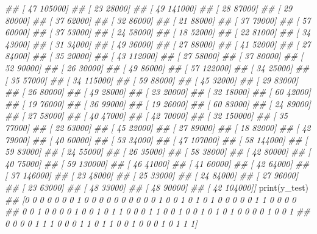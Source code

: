 \documentclass[
]{book}
\newenvironment{Shaded}{\begin{snugshade}}{\end{snugshade}}
\newcommand{\BuiltInTok}[1]{#1}
\newcommand{\CommentTok}[1]{\textcolor[rgb]{0.56,0.35,0.01}{\textit{#1}}}
\newcommand{\NormalTok}[1]{#1}
\theoremstyle{definition}
\theoremstyle{definition}
\theoremstyle{definition}
\theoremstyle{definition}
\theoremstyle{remark}
\begin{document}
\begin{Shaded}
\begin{Highlighting}[]
\CommentTok{\#\#  [    47 105000]}
\CommentTok{\#\#  [    23  28000]}
\CommentTok{\#\#  [    49 141000]}
\CommentTok{\#\#  [    28  87000]}
\CommentTok{\#\#  [    29  80000]}
\CommentTok{\#\#  [    37  62000]}
\CommentTok{\#\#  [    32  86000]}
\CommentTok{\#\#  [    21  88000]}
\CommentTok{\#\#  [    37  79000]}
\CommentTok{\#\#  [    57  60000]}
\CommentTok{\#\#  [    37  53000]}
\CommentTok{\#\#  [    24  58000]}
\CommentTok{\#\#  [    18  52000]}
\CommentTok{\#\#  [    22  81000]}
\CommentTok{\#\#  [    34  43000]}
\CommentTok{\#\#  [    31  34000]}
\CommentTok{\#\#  [    49  36000]}
\CommentTok{\#\#  [    27  88000]}
\CommentTok{\#\#  [    41  52000]}
\CommentTok{\#\#  [    27  84000]}
\CommentTok{\#\#  [    35  20000]}
\CommentTok{\#\#  [    43 112000]}
\CommentTok{\#\#  [    27  58000]}
\CommentTok{\#\#  [    37  80000]}
\CommentTok{\#\#  [    52  90000]}
\CommentTok{\#\#  [    26  30000]}
\CommentTok{\#\#  [    49  86000]}
\CommentTok{\#\#  [    57 122000]}
\CommentTok{\#\#  [    34  25000]}
\CommentTok{\#\#  [    35  57000]}
\CommentTok{\#\#  [    34 115000]}
\CommentTok{\#\#  [    59  88000]}
\CommentTok{\#\#  [    45  32000]}
\CommentTok{\#\#  [    29  83000]}
\CommentTok{\#\#  [    26  80000]}
\CommentTok{\#\#  [    49  28000]}
\CommentTok{\#\#  [    23  20000]}
\CommentTok{\#\#  [    32  18000]}
\CommentTok{\#\#  [    60  42000]}
\CommentTok{\#\#  [    19  76000]}
\CommentTok{\#\#  [    36  99000]}
\CommentTok{\#\#  [    19  26000]}
\CommentTok{\#\#  [    60  83000]}
\CommentTok{\#\#  [    24  89000]}
\CommentTok{\#\#  [    27  58000]}
\CommentTok{\#\#  [    40  47000]}
\CommentTok{\#\#  [    42  70000]}
\CommentTok{\#\#  [    32 150000]}
\CommentTok{\#\#  [    35  77000]}
\CommentTok{\#\#  [    22  63000]}
\CommentTok{\#\#  [    45  22000]}
\CommentTok{\#\#  [    27  89000]}
\CommentTok{\#\#  [    18  82000]}
\CommentTok{\#\#  [    42  79000]}
\CommentTok{\#\#  [    40  60000]}
\CommentTok{\#\#  [    53  34000]}
\CommentTok{\#\#  [    47 107000]}
\CommentTok{\#\#  [    58 144000]}
\CommentTok{\#\#  [    59  83000]}
\CommentTok{\#\#  [    24  55000]}
\CommentTok{\#\#  [    26  35000]}
\CommentTok{\#\#  [    58  38000]}
\CommentTok{\#\#  [    42  80000]}
\CommentTok{\#\#  [    40  75000]}
\CommentTok{\#\#  [    59 130000]}
\CommentTok{\#\#  [    46  41000]}
\CommentTok{\#\#  [    41  60000]}
\CommentTok{\#\#  [    42  64000]}
\CommentTok{\#\#  [    37 146000]}
\CommentTok{\#\#  [    23  48000]}
\CommentTok{\#\#  [    25  33000]}
\CommentTok{\#\#  [    24  84000]}
\CommentTok{\#\#  [    27  96000]}
\CommentTok{\#\#  [    23  63000]}
\CommentTok{\#\#  [    48  33000]}
\CommentTok{\#\#  [    48  90000]}
\CommentTok{\#\#  [    42 104000]]}
\BuiltInTok{print}\NormalTok{(y\_test)}
\CommentTok{\#\# [0 0 0 0 0 0 0 1 0 0 0 0 0 0 0 0 0 0 1 0 0 1 0 1 0 1 0 0 0 0 0 1 1 0 0 0 0}
\CommentTok{\#\#  0 0 1 0 0 0 0 1 0 0 1 0 1 1 0 0 0 1 1 0 0 1 0 0 1 0 1 0 1 0 0 0 0 1 0 0 1}
\CommentTok{\#\#  0 0 0 0 1 1 1 0 0 0 1 1 0 1 1 0 0 1 0 0 0 1 0 1 1 1]}
\end{Highlighting}
\end{Shaded}
\end{document}

